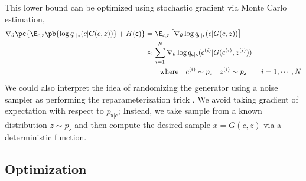 \documentclass[11pt]{article}
\newcommand\rx{\ensuremath{\mathsf{x}}}
\newcommand\rc{\ensuremath{\mathsf{c}}}
\newcommand\rz{\ensuremath{\mathsf{z}}}
\begin{document}
This lower bound can be optimized using stochastic gradient via Monte Carlo estimation,
\begin{align*}
    \nabla_{\theta} \pc{ \E_{\rc,\rz} \pb{ \log q_{\rc|\rx}(c|G(c,z)) } + H(\rc) } 
        &= \E_{\rc,\rz} \left[ \nabla_{\theta} \log q_{\rc|\rx}(c|G(c,z)) \right] \\
        &\approx \sum_{i=1}^N  \nabla_{\theta} \log q_{\rc|\rx}(c^{(i)}|G(c^{(i)},z^{(i)})) \\
        &\quad\quad\text{where} \quad c^{(i)} \sim p_{\rc} \quad z^{(i)} \sim p_{\rz} \quad\quad i=1,\cdots,N
\end{align*}
We could also interpret the idea of randomizing the generator using a noise sampler as performing the reparameterization trick \cite{kingmaAutoEncodingVariationalBayes2014}. We avoid taking gradient of expectation with respect to $p_{\rx|\rc}$; Instead, we take sample from a known distribution $z\sim p_{\rz}$ and then compute the desired sample $x = G(c,z)$ via a deterministic function.



\subsection{Optimization}
\end{document}
